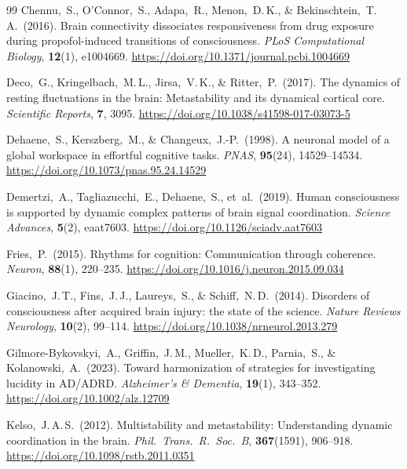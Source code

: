 \documentclass[11pt,a4paper]{article}
\theoremstyle{plain}
\theoremstyle{definition}
\theoremstyle{remark}
\begin{document}
\begin{thebibliography}{99}
Chennu,~S., O'Connor,~S., Adapa,~R., Menon,~D.\,K., \& Bekinschtein,~T.\,A.\ (2016).
Brain connectivity dissociates responsiveness from drug exposure during propofol-induced transitions of consciousness.
\textit{PLoS Computational Biology}, \textbf{12}(1), e1004669.
\url{https://doi.org/10.1371/journal.pcbi.1004669}

Deco,~G., Kringelbach,~M.\,L., Jirsa,~V.\,K., \& Ritter,~P.\ (2017).
The dynamics of resting fluctuations in the brain: Metastability and its dynamical cortical core.
\textit{Scientific Reports}, \textbf{7}, 3095.
\url{https://doi.org/10.1038/s41598-017-03073-5}

Dehaene,~S., Kerszberg,~M., \& Changeux,~J.-P.\ (1998).
A neuronal model of a global workspace in effortful cognitive tasks.
\textit{PNAS}, \textbf{95}(24), 14529--14534.
\url{https://doi.org/10.1073/pnas.95.24.14529}

Demertzi,~A., Tagliazucchi,~E., Dehaene,~S., et~al.\ (2019).
Human consciousness is supported by dynamic complex patterns of brain signal coordination.
\textit{Science Advances}, \textbf{5}(2), eaat7603.
\url{https://doi.org/10.1126/sciadv.aat7603}

Fries,~P.\ (2015).
Rhythms for cognition: Communication through coherence.
\textit{Neuron}, \textbf{88}(1), 220--235.
\url{https://doi.org/10.1016/j.neuron.2015.09.034}

Giacino,~J.\,T., Fins,~J.\,J., Laureys,~S., \& Schiff,~N.\,D.\ (2014).
Disorders of consciousness after acquired brain injury: the state of the science.
\textit{Nature Reviews Neurology}, \textbf{10}(2), 99--114.
\url{https://doi.org/10.1038/nrneurol.2013.279}

Gilmore-Bykovskyi,~A., Griffin,~J.\,M., Mueller,~K.\,D., Parnia,~S., \& Kolanowski,~A.\ (2023).
Toward harmonization of strategies for investigating lucidity in AD/ADRD.
\textit{Alzheimer's \& Dementia}, \textbf{19}(1), 343--352.
\url{https://doi.org/10.1002/alz.12709}

Kelso,~J.\,A.\,S.\ (2012).
Multistability and metastability: Understanding dynamic coordination in the brain.
\textit{Phil.\ Trans.\ R.\ Soc.\ B}, \textbf{367}(1591), 906--918.
\url{https://doi.org/10.1098/rstb.2011.0351}


\end{thebibliography}
\end{document}
